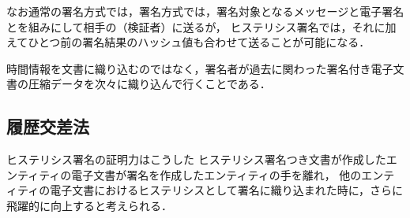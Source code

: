 \documentclass[a4paper,12pt]{jsarticle}
\begin{document}
なお通常の署名方式では，署名方式では，署名対象となるメッセージと電子署名とを組みにして相手の（検証者）に送るが，
ヒステリシス署名では，それに加えてひとつ前の署名結果のハッシュ値も合わせて送ることが可能になる．

時間情報を文書に織り込むのではなく，署名者が過去に関わった署名付き電子文書の圧縮データを次々に織り込んで行くことである．









      \subsection{履歴交差法}
ヒステリシス署名の証明力はこうした
ヒステリシス署名つき文書が作成したエンティティの電子文書が署名を作成したエンティティの手を離れ，
他のエンティティの電子文書におけるヒステリシスとして署名に織り込まれた時に，さらに飛躍的に向上すると考えられる．
\end{document}
